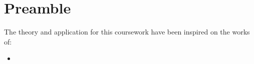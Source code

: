 \chapter{Preamble}
The theory and application for this coursework have been inspired on the works of:
\begin{itemize}
    \item \cite{spiralModelSoftDev}
\end{itemize}